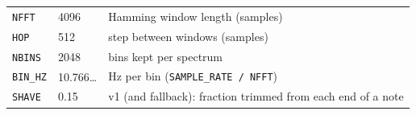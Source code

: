 \documentclass[
  10pt,
]{article}
\begin{document}
\begin{longtable}[]{@{}lll@{}}
\begin{minipage}[t]{0.30\columnwidth}\raggedright
\texttt{NFFT}\strut
\end{minipage} &
\begin{minipage}[t]{0.30\columnwidth}\raggedright
4096\strut
\end{minipage} &
\begin{minipage}[t]{0.30\columnwidth}\raggedright
Hamming window length (samples)\strut
\end{minipage}\tabularnewline
\begin{minipage}[t]{0.30\columnwidth}\raggedright
\texttt{HOP}\strut
\end{minipage} &
\begin{minipage}[t]{0.30\columnwidth}\raggedright
512\strut
\end{minipage} &
\begin{minipage}[t]{0.30\columnwidth}\raggedright
step between windows (samples)\strut
\end{minipage}\tabularnewline
\begin{minipage}[t]{0.30\columnwidth}\raggedright
\texttt{NBINS}\strut
\end{minipage} &
\begin{minipage}[t]{0.30\columnwidth}\raggedright
2048\strut
\end{minipage} &
\begin{minipage}[t]{0.30\columnwidth}\raggedright
bins kept per spectrum\strut
\end{minipage}\tabularnewline
\begin{minipage}[t]{0.30\columnwidth}\raggedright
\texttt{BIN\_HZ}\strut
\end{minipage} &
\begin{minipage}[t]{0.30\columnwidth}\raggedright
10.766\ldots{}\strut
\end{minipage} &
\begin{minipage}[t]{0.30\columnwidth}\raggedright
Hz per bin (\texttt{SAMPLE\_RATE\ /\ NFFT})\strut
\end{minipage}\tabularnewline
\begin{minipage}[t]{0.30\columnwidth}\raggedright
\texttt{SHAVE}\strut
\end{minipage} &
\begin{minipage}[t]{0.30\columnwidth}\raggedright
0.15\strut
\end{minipage} &
\begin{minipage}[t]{0.30\columnwidth}\raggedright
v1 (and fallback): fraction trimmed from each end of a
note\strut
\end{minipage}\tabularnewline

\end{longtable}
\end{document}
